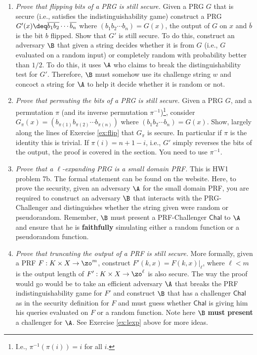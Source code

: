 \documentclass[A4, 11pt]{article}
\newcommand{\Chal}{\ensuremath{\mathsf{Chal}}}
\begin{document}
\begin{enumerate}

\item \label{ex:flip} {\it Prove that flipping bits of a PRG is still
secure.} Given a PRG $G$ that is secure (i.e., satisfies the
indistinguishability game) construct a PRG $G'(x) \deq \overline{b_1}
\overline{b_2} \cdots \overline{b_n}$ where $(b_1b_2\cdots b_n) = G(x)$,
the output of $G$ on $x$ and $\overline{b}$ is the bit $b$ flipped. Show
that $G'$ is still secure. To do this, construct an adversary $\B$ that
given a string decides whether it is from $G$ (i.e., $G$ evaluated on a
random input) or completely random with probability better than $1/2$. To
do this, it uses $\A$ who claims to break the distinguishability test for
$G'$. Therefore, $\B$ must somehow use its challenge string $w$ and concoct
a string for $\A$ to help it decide whether it is random or not. 

\item {\it Prove that permuting the bits of a PRG is still secure.} Given a
PRG $G$, and a permutation $\pi$ (and its inverse permutation
$\pi^{-1}$)\footnote{I.e., $\pi^{-1}(\pi(i))=i$ for all $i$.},
consider $G_\pi(x) = (b_{\pi(1)}b_{\pi(2)}\cdots b_{\pi(n)})$ where
$(b_1b_2\cdots b_n) = G(x)$. Show, largely along the lines of Exercise
\ref{ex:flip} that $G_\pi$ is secure. In particular if $\pi$ is the
identity this is trivial. If $\pi(i)=n+1-i$, i.e., $G'$ simply reverses the
bits of the output, the proof is covered in the section. You need to use
$\pi^{-1}$.  

\item \label{ex:lexp}{\it Prove that a $\ell$-expanding PRG is a small
domain PRF.} This is HW1 problem 7b. The formal statement can be found on
the website. Here, to prove the security, given an adversary $\A$ for the
small domain PRF, you are required to construct an adversary $\B$ that
interacts with the PRG-Challenger and distinguishes whether the string
given were random or pseudorandom. Remember, $\B$ must present a
PRF-Challenger $\Chal$ to $\A$ and ensure that he is {\bf faithfully}
simulating either a random function or a pseudorandom function. 

\item \label{ex:prftrunc}{\it Prove that truncating the output of a PRF is
still secure.} More formally, given a PRF $F:K \times X \rightarrow \zo^m$,
construct $F'(k,x)=F(k,x)|_\ell$, where $\ell < m$ is the output length of
$F':K \times X \rightarrow \zo^\ell$ is also secure. The way the proof
would go would be to take an efficient adversary $\A$ that breaks the PRF
indistinguishability game for $F'$ and construct $\B$ that has a challenger
$\Chal$ as in the security definition for $F$ and must guess whether
$\Chal$ is giving him his queries evaluated on $F$ or a random function.
Note here $\B$ {\bf must present} a challenger for $\A$. See Exercise
\ref{ex:lexp} above for more ideas. 


\end{enumerate}
\end{document}

